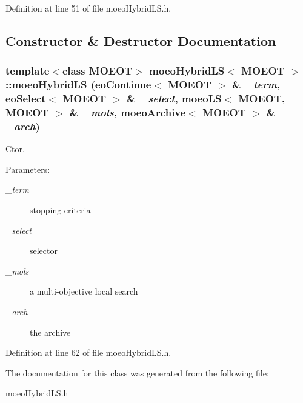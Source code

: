 Definition at line 51 of file moeo\-Hybrid\-LS.h.

\subsection{Constructor \& Destructor Documentation}
\subsubsection{\setlength{\rightskip}{0pt plus 5cm}template$<$class MOEOT$>$ \bf{moeo\-Hybrid\-LS}$<$ MOEOT $>$::\bf{moeo\-Hybrid\-LS} (\bf{eo\-Continue}$<$ MOEOT $>$ \& {\em \_\-term}, \bf{eo\-Select}$<$ MOEOT $>$ \& {\em \_\-select}, \bf{moeo\-LS}$<$ MOEOT, MOEOT $>$ \& {\em \_\-mols}, \bf{moeo\-Archive}$<$ MOEOT $>$ \& {\em \_\-arch})\hspace{0.3cm}{\tt  [inline]}}\label{classmoeoHybridLS_e669b2ca5e17467eb9819c71557aad53}


Ctor. 

\begin{Desc}
\item[Parameters:]
\begin{description}
\item[{\em \_\-term}]stopping criteria \item[{\em \_\-select}]selector \item[{\em \_\-mols}]a multi-objective local search \item[{\em \_\-arch}]the archive \end{description}
\end{Desc}


Definition at line 62 of file moeo\-Hybrid\-LS.h.

The documentation for this class was generated from the following file:\begin{CompactItemize}
\item 
moeo\-Hybrid\-LS.h\end{CompactItemize}
